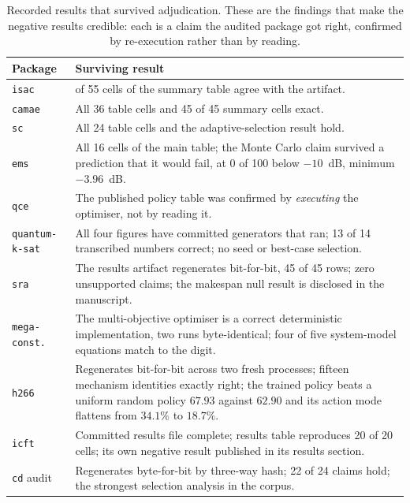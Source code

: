 \documentclass[sigconf,review]{acmart}
\newcommand{\pkb}[1]{\texttt{\allowbreak{}#1}}
\begin{document}
\begin{table}[t]
\centering
\caption{Recorded results that survived adjudication. These are the findings
that make the negative results credible: each is a claim the audited package
got right, confirmed by re-execution rather than by reading.}
\label{tab:survived}
\small
\setlength{\tabcolsep}{3.4pt}
\begin{tabular}{>{\raggedright\arraybackslash}p{}>{\raggedright\arraybackslash}p{}}
\toprule
Package & Surviving result \\
\midrule
\pkb{isac} & 55 of 55 cells of the summary table agree with the artifact. \\
\pkb{camae} & All 36 table cells and 45 of 45 summary cells exact. \\
\pkb{sc} & All 24 table cells and the adaptive-selection result hold. \\
\pkb{ems} & All 16 cells of the main table; the Monte Carlo claim survived a prediction that it would fail, at 0 of 100 below $-10$~dB, minimum $-3.96$~dB. \\
\pkb{qce} & The published policy table was confirmed by \emph{executing} the optimiser, not by reading it. \\
\pkb{quantum-k-sat} & All four figures have committed generators that ran; 13 of 14 transcribed numbers correct; no seed or best-case selection. \\
\pkb{sra} & The results artifact regenerates bit-for-bit, 45 of 45 rows; zero unsupported claims; the makespan null result is disclosed in the manuscript. \\
\pkb{mega-const.} & The multi-objective optimiser is a correct deterministic implementation, two runs byte-identical; four of five system-model equations match to the digit. \\
\pkb{h266} & Regenerates bit-for-bit across two fresh processes; fifteen mechanism identities exactly right; the trained policy beats a uniform random policy $67.93$ against $62.90$ and its action mode flattens from $34.1\%$ to $18.7\%$. \\
\pkb{icft} & Committed results file complete; results table reproduces 20 of 20 cells; its own negative result published in its results section. \\
\pkb{cd} audit & Regenerates byte-for-bit by three-way hash; 22 of 24 claims hold; the strongest selection analysis in the corpus. \\
\bottomrule
\end{tabular}
\end{table}
\end{document}

